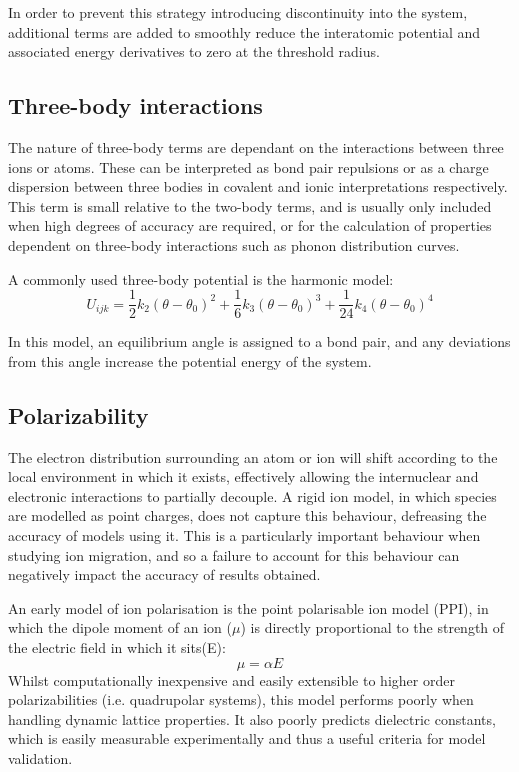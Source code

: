 In order to prevent this strategy introducing discontinuity into the system, additional terms are added to smoothly reduce the interatomic potential and associated energy derivatives to zero at the threshold radius. %


\subsection{Three-body interactions}
The nature of three-body terms are dependant on the interactions between three ions or atoms.
These can be interpreted as bond pair repulsions or as a charge dispersion between three bodies in covalent and ionic interpretations respectively.
This term is small relative to the two-body terms, and is usually only included when high degrees of accuracy are required, or for the calculation of properties dependent on three-body interactions such as phonon distribution curves.

A commonly used three-body potential is the harmonic model:
\begin{equation}
  U_{ijk} = \frac{1}{2}k_2(\theta-\theta_0)^2   + \frac{1}{6}k_3(\theta-\theta_0)^3    + \frac{1}{24}k_4(\theta-\theta_0)^4
  \label{eq:threebody}
\end{equation}

In this model, an equilibrium angle is assigned to a bond pair, and any deviations from this angle increase the potential energy of the system.

\subsection{Polarizability}
The electron distribution surrounding an atom or ion will shift according to the local environment in which it exists, effectively allowing the internuclear and electronic interactions to partially decouple.
A rigid ion model, in which species are modelled as point charges, does not capture this behaviour, defreasing the accuracy of models using it.
This is a particularly important behaviour when studying ion migration, and so a failure to account for this behaviour can negatively impact the accuracy of results obtained.

An early model of ion polarisation is the point polarisable ion model (PPI), in which the dipole moment of an ion ($\mu$) is directly proportional to the strength of the electric field in which it sits(E):
\begin{equation}
\mu = \alpha E
\end{equation}
Whilst computationally inexpensive and easily extensible to higher order polarizabilities (i.e. quadrupolar systems), this model performs poorly when handling dynamic lattice properties.
It also poorly predicts dielectric constants, which is easily measurable experimentally and thus a useful criteria for model validation.


